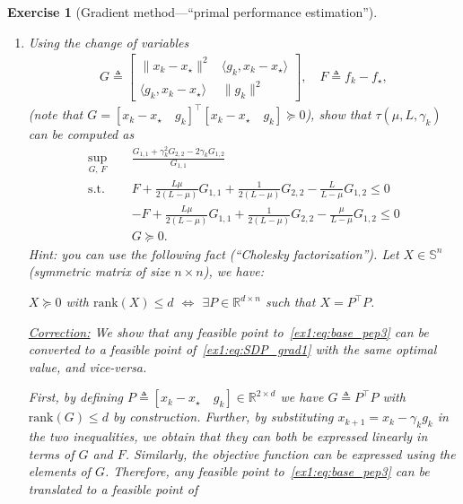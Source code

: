 \documentclass[11pt,a4paper]{article}
\newcommand{\correction}[1]{{{\color{blue}\underline{Correction:} #1}}}
\newcommand{\correction}[1]{}
\newtheorem{exercise}{Exercise}
\begin{document}
\begin{exercise}[Gradient method---``primal performance estimation'']
\begin{enumerate}
	\correction{From , there exists an $L$-smooth $\mu$-strongly convex function satisfying $g_k=\nabla f(x_k)$, $g_\star=\nabla f(x_\star)$, $f_k=f(x_k)$ and $f_\star=f(x_\star)$ if and only if those inequalities are satisfied. Hence any feasible point to~\eqref{ex1:eq:base_pep3} can be converted to a feasible point to~\eqref{ex1:eq:base_pep2} and vice-versa (\Cref{thm:interp_smoothstronglyconvex} provides necessary and sufficient conditions).}
	\item Using the change of variables
			\begin{align*}
			G \triangleq \begin{bmatrix}
			\|x_k-x_\star\|^2 & \langle g_k,x_k-x_\star\rangle\\
			\langle g_k, x_k-x_\star\rangle & \| g_k\|^2
			\end{bmatrix},\quad 	F \triangleq 			f_k-f_\star,
			\end{align*}
			(note that $G=[x_k-x_\star \quad g_k]^\top [x_k-x_\star \quad g_k]\succcurlyeq 0$), show that $\tau(\mu,L,\gamma_k)$ can be computed as
			\begin{equation}\label{ex1:eq:SDP_grad1}
			\begin{aligned}
			\sup_{G,\, F} \quad & \frac{G_{1,1}+\gamma_k ^2 G_{2,2}-2\gamma_k G_{1,2}}{G_{1,1}}\\
			\text{s.t. } \quad & F + \tfrac{L\mu}{2(L-\mu)} G_{1,1}+\tfrac{1}{2(L-\mu)}G_{2,2}-\tfrac{L}{L-\mu}G_{1,2}\leqslant 0\\
			&-F + \tfrac{L\mu}{2(L-\mu)} G_{1,1}+\tfrac{1}{2(L-\mu)}G_{2,2}-\tfrac{\mu}{L-\mu}G_{1,2}\leqslant 0\\
			&G\succcurlyeq 0.
			\end{aligned}
			\end{equation}
	Hint: you can use the following fact (``Cholesky factorization''). Let $X\in \mathbb{S}^n$ (symmetric matrix of size $n\times n$), we have:
	\begin{center}
	$X\succcurlyeq 0$ with $\mathrm{rank}(X)\leqslant d$ $\Leftrightarrow$ $\exists P\in\mathbb{R}^{d\times n}$ such that $X=P^\top\! P$.
	\end{center}
	
	
	\correction{We show that any feasible point to~\eqref{ex1:eq:base_pep3} can be converted to a feasible point of~\eqref{ex1:eq:SDP_grad1} with the same optimal value, and vice-versa.
	
	First, by defining $P\triangleq[x_k-x_\star \quad g_k]\in\mathbb{R}^{2\times d}$ we have $G\triangleq P^{\top\!}P$ with $\mathrm{rank}(G)\leq d$ by construction. Further, by substituting $x_{k+1}=x_k-\gamma_k g_k$ in the two inequalities, we obtain that they can both be expressed linearly in terms of $G$ and $F$. Similarly, the objective function can be expressed using the elements of $G$. Therefore, any feasible point to~\eqref{ex1:eq:base_pep3} can be translated to a feasible point of

}
\end{enumerate}
\end{exercise}
\end{document}
